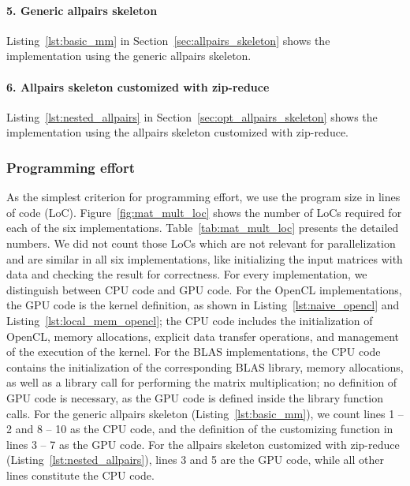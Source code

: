 \vspace{-.5em}
\paragraph{5. Generic allpairs skeleton}
Listing~\ref{lst:basic_mm} in Section~\ref{sec:allpairs_skeleton} shows the implementation using the generic allpairs skeleton.

\vspace{-.5em}
\paragraph{6. Allpairs skeleton customized with zip-reduce}
Listing~\ref{lst:nested_allpairs} in Section~\ref{sec:opt_allpairs_skeleton} shows the implementation using the allpairs skeleton customized with zip-reduce.


\subsubsection{Programming effort}
As the simplest criterion for programming effort, we use the program size in lines of code (LoC).
Figure~\ref{fig:mat_mult_loc} shows the number of LoCs required for each of the six implementations.
Table~\ref{tab:mat_mult_loc} presents the detailed numbers.
We did not count those LoCs which are not relevant for parallelization and are similar in all six implementations, like initializing the input matrices with data and checking the result for correctness.
For every implementation, we distinguish between CPU code and GPU code.
For the OpenCL implementations, the GPU code is the kernel definition, as shown in Listing~\ref{lst:naive_opencl} and Listing~\ref{lst:local_mem_opencl};
the CPU code includes the initialization of OpenCL, memory allocations, explicit data transfer operations, and management of the execution of the kernel.
For the BLAS implementations, the CPU code contains the initialization of the corresponding BLAS library, memory allocations, as well as a library call for performing the matrix multiplication;
no definition of GPU code is necessary, as the GPU code is defined inside the library function calls.
For the generic allpairs skeleton (Listing~\ref{lst:basic_mm}), we count lines 1 -- 2 and 8 -- 10 as the CPU code, and the definition of the customizing function in lines 3 -- 7 as the GPU code.
For the allpairs skeleton customized with zip-reduce (Listing~\ref{lst:nested_allpairs}), lines 3 and 5 are the GPU code, while all other lines constitute the CPU code.

